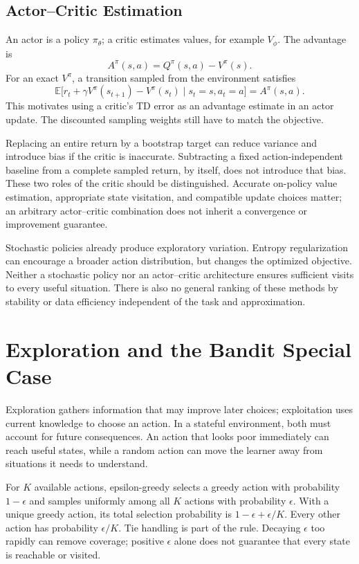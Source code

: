 \subsection{Actor--Critic Estimation}

An actor is a policy $\pi_\theta$; a critic estimates values, for example $V_\phi$. The advantage is
\[
A^\pi(s,a)=Q^\pi(s,a)-V^\pi(s).
\]
For an exact $V^\pi$, a transition sampled from the environment satisfies
\[
\mathbb E\bigl[r_t+\gamma V^\pi(s_{t+1})-V^\pi(s_t)
\mid s_t=s,a_t=a\bigr]=A^\pi(s,a).
\]
This motivates using a critic's TD error as an advantage estimate in an actor update. The discounted sampling weights still have to match the objective.

Replacing an entire return by a bootstrap target can reduce variance and introduce bias if the critic is inaccurate. Subtracting a fixed action-independent baseline from a complete sampled return, by itself, does not introduce that bias. These two roles of the critic should be distinguished. Accurate on-policy value estimation, appropriate state visitation, and compatible update choices matter; an arbitrary actor--critic combination does not inherit a convergence or improvement guarantee.

Stochastic policies already produce exploratory variation. Entropy regularization can encourage a broader action distribution, but changes the optimized objective. Neither a stochastic policy nor an actor--critic architecture ensures sufficient visits to every useful situation. There is also no general ranking of these methods by stability or data efficiency independent of the task and approximation.

\section{Exploration and the Bandit Special Case}

Exploration gathers information that may improve later choices; exploitation uses current knowledge to choose an action. In a stateful environment, both must account for future consequences. An action that looks poor immediately can reach useful states, while a random action can move the learner away from situations it needs to understand.

For $K$ available actions, epsilon-greedy selects a greedy action with probability $1-\epsilon$ and samples uniformly among all $K$ actions with probability $\epsilon$. With a unique greedy action, its total selection probability is $1-\epsilon+\epsilon/K$. Every other action has probability $\epsilon/K$. Tie handling is part of the rule. Decaying $\epsilon$ too rapidly can remove coverage; positive $\epsilon$ alone does not guarantee that every state is reachable or visited.

